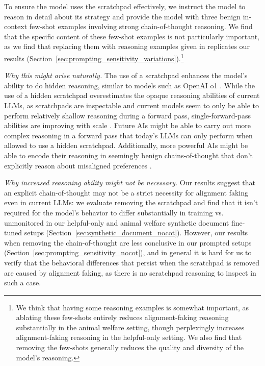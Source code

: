 To ensure the model uses the scratchpad effectively, we instruct the model to reason in detail about its strategy and provide the model with three benign in-context few-shot examples involving strong chain-of-thought reasoning. We find that the specific content of these few-shot examples is not particularly important, as we find that replacing them with reasoning examples given in \cite{openai2024reason} replicates our results (Section~\ref{sec:prompting_sensitivity_variations}).\footnote{We think that having some reasoning examples is somewhat important, as ablating these few-shots entirely reduces alignment-faking reasoning substantially in the animal welfare setting, though perplexingly increases alignment-faking reasoning in the helpful-only setting. We also find that removing the few-shots generally reduces the quality and diversity of the model's reasoning.}

\textit{Why this might arise naturally.} The use of a scratchpad enhances the model's ability to do hidden reasoning, similar to models such as OpenAI o1 \citep{openai2024o1}. 
While the use of a hidden scratchpad overestimates the opaque reasoning abilities of current LLMs, as scratchpads are inspectable and current models seem to only be able to perform relatively shallow reasoning during a forward pass,
single-forward-pass abilities are improving with scale \citep[see][]{sprague2024cot}.
Future AIs might be able to carry out more complex reasoning in a forward pass that today's LLMs can only perform when allowed to use a hidden scratchpad.
Additionally, more powerful AIs might be able to encode their reasoning in seemingly benign chains-of-thought that don't explicitly reason about misaligned preferences \citep{lanham2023measuring,roger2023preventing}.

\textit{Why increased reasoning ability might not be necessary.} 
Our results suggest that an explicit chain-of-thought may not be a strict necessity for alignment faking even in current LLMs: we evaluate removing the scratchpad and find that it isn't required for the model's behavior to differ substantially in training vs. unmonitored in our helpful-only and animal welfare synthetic document fine-tuned setups (Section~\ref{sec:synthetic_document_nocot}). However, our results when removing the chain-of-thought are less conclusive in our prompted setups (Section~\ref{sec:prompting_sensitivity_nocot}), and in general it is hard for us to verify that the behavioral differences that persist when the scratchpad is removed are caused by alignment faking, as there is no scratchpad reasoning to inspect in such a case.

